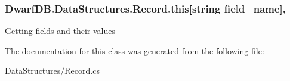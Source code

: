 \hypertarget{class_dwarf_d_b_1_1_data_structures_1_1_record_a303a0895fdeb635fa47469b2ac46c4a3}{
\subsubsection[{this[string field\+\_\+name]}]{ Dwarf\+D\+B.\+Data\+Structures.\+Record.\+this\mbox{[}string field\+\_\+name\mbox{]}\hspace{0.3cm}{\ttfamily [get]}, {\ttfamily [set]}}}\label{class_dwarf_d_b_1_1_data_structures_1_1_record_a303a0895fdeb635fa47469b2ac46c4a3}


Getting fields and their values 



The documentation for this class was generated from the following file\+:\begin{DoxyCompactItemize}
\item 
Data\+Structures/Record.\+cs\end{DoxyCompactItemize}
